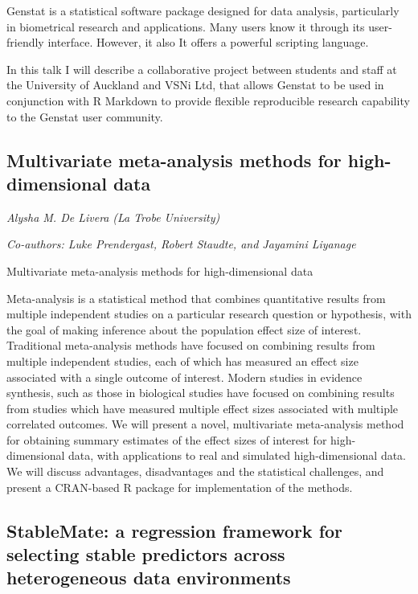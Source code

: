\documentclass[
]{scrreprt}
\begin{document}
Genstat is a statistical software package designed for data analysis,
particularly in biometrical research and applications. Many users know
it through its user-friendly interface. However, it also It offers a
powerful scripting language.

In this talk I will describe a collaborative project between students
and staff at the University of Auckland and VSNi Ltd, that allows
Genstat to be used in conjunction with R Markdown to provide flexible
reproducible research capability to the Genstat user community.

\subsection{Multivariate meta-analysis methods for high-dimensional
data}\label{multivariate-meta-analysis-methods-for-high-dimensional-data}

\emph{Alysha M. De Livera} \emph{(La Trobe
University)}

\emph{Co-authors: Luke Prendergast, Robert Staudte, and Jayamini
Liyanage}

\setlength{\parskip}{0.5em}

Multivariate meta-analysis methods for high-dimensional data

Meta-analysis is a statistical method that combines quantitative results
from multiple independent studies on a particular research question or
hypothesis, with the goal of making inference about the population
effect size of interest. Traditional meta-analysis methods have focused
on combining results from multiple independent studies, each of which
has measured an effect size associated with a single outcome of
interest. Modern studies in evidence synthesis, such as those in
biological studies have focused on combining results from studies which
have measured multiple effect sizes associated with multiple correlated
outcomes. We will present a novel, multivariate meta-analysis method for
obtaining summary estimates of the effect sizes of interest for
high-dimensional data, with applications to real and simulated
high-dimensional data. We will discuss advantages, disadvantages and the
statistical challenges, and present a CRAN-based R package for
implementation of the methods.

\subsection{StableMate: a regression framework for selecting stable
predictors across heterogeneous data
environments}\label{stablemate-a-regression-framework-for-selecting-stable-predictors-across-heterogeneous-data-environments}
\end{document}
